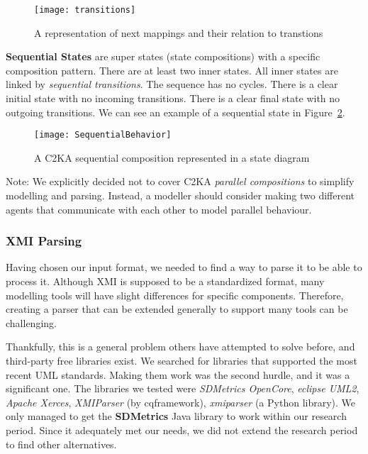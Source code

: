 \begin{figure}[ht]
    \centering
    \texttt{[image: transitions]}
    \caption{A representation of next mappings and their relation to transtions}
    \label{fig:transition}
\end{figure}

\textbf{Sequential States} are super states (state compositions) with a specific composition pattern.
There are at least two inner states.
All inner states are linked by \textit{sequential transitions}.
The sequence has no cycles.
There is a clear initial state with no incoming transitions.
There is a clear final state with no outgoing transitions.
We can see an example of a sequential state in Figure~\ref{fig:sequential}.

\begin{figure}[ht]
    \centering
    \texttt{[image: SequentialBehavior]}
    \caption{A C2KA sequential composition represented in a state diagram}
    \label{fig:sequential}
\end{figure}

Note: We explicitly decided not to cover C2KA \textit{parallel compositions} to simplify modelling and parsing.
Instead, a modeller should consider making two different agents that communicate
with each other to model parallel behaviour.

\subsubsection{XMI Parsing}\label{subsubsec:parsing}
Having chosen our input format, we needed to find a way to parse it to be able to process it.
Although XMI is supposed to be a standardized format,
many modelling tools will have slight differences for specific components.
Therefore, creating a parser that can be extended generally to support many tools can be challenging.

Thankfully, this is a general problem others have attempted to solve before, and third-party free libraries exist.
We searched for libraries that supported the most recent UML standards.
Making them work was the second hurdle, and it was a significant one.
The libraries we tested were \textit{SDMetrics OpenCore},
\textit{eclipse UML2}, \textit{Apache Xerces}, \textit{XMIParser} (by cqframework), \textit{xmiparser} (a Python library).
We only managed to get the \textbf{SDMetrics} Java library to work within our research period.
Since it adequately met our needs, we did not extend the research period to find other alternatives.

